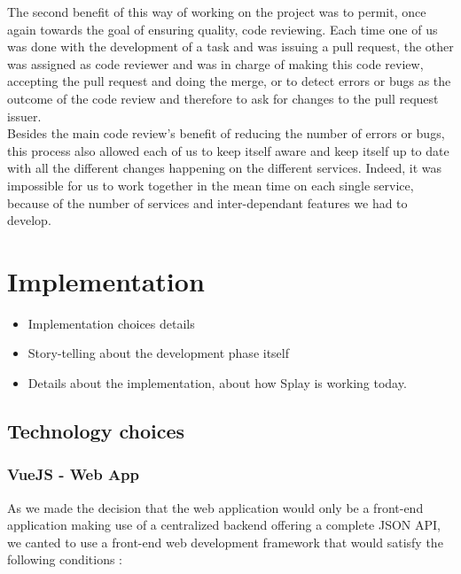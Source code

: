 \documentclass{eplmastersthesis}
\begin{document}
        The second benefit of this way of working on the project was to
        permit, once again towards the goal of ensuring quality, code reviewing.
        Each time one of us was done with the development of a task and was
        issuing a pull request, the other was assigned as code reviewer and
        was in charge of making this code review, accepting the pull request and
        doing the merge, or to detect errors or bugs as the outcome of the
        code review and therefore to ask for changes to the pull request issuer. \\
        Besides the main code review's benefit of reducing the number of errors
        or bugs, this process also allowed each of us to keep itself aware and
        keep itself up to date with all the different changes happening on the
        different services. Indeed, it was impossible for us to work together
        in the mean time on each single service, because of the number of
        services and inter-dependant features we had to develop.

  \chapter{Implementation}

    \begin{itemize}
      \item Implementation choices details
      \item Story-telling about the development phase itself
      \item Details about the implementation, about how Splay is working today.
    \end{itemize}

    \section{Technology choices}

      \subsection{VueJS - Web App}

        As we made the decision that the web application would only be a
        front-end application making use of a centralized backend offering
        a complete JSON API, we canted to use a front-end web development
        framework that would satisfy the following conditions : \\
\end{document}
